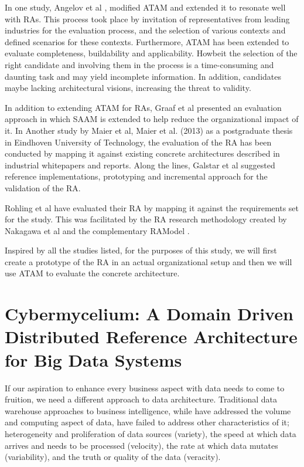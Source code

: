 \documentclass[review]{elsarticle}
\begin{document}
In one study, Angelov et al \cite{angelov2008towards}, modified ATAM and extended it to resonate well with RAs. This process took place by invitation of representatives from leading industries for the evaluation process, and the selection of various contexts and defined scenarios for these contexts. Furthermore, ATAM has been extended to evaluate completeness, buildability and applicability. Howbeit the selection of the right candidate and involving them in the process is a time-consuming and daunting task and may yield incomplete information. In addition, candidates maybe lacking architectural visions, increasing the threat to validity.

In addition to extending ATAM for RAs, Graaf et al \cite{graaf2005evaluating} presented an evaluation approach in which SAAM is extended to help reduce the organizational impact of it. In Another study by Maier et al, Maier et al. (2013) as a postgraduate thesis in Eindhoven University of Technology, the evaluation of the RA has been conducted by mapping it against existing concrete architectures described in industrial whitepapers and reports. Along the lines, Galstar et al \cite{galster2011empirically} suggested reference implementations, prototyping and incremental approach for the validation of the RA.

Rohling et al \cite{rohling2019reference} have evaluated their RA by mapping it against the requirements set for the study. This was facilitated by the RA research methodology created by Nakagawa et al \cite{Nakagawa} and the complementary RAModel \cite{nakagawa2012ramodel}.

Inspired by all the studies listed, for the purposes of this study, we will first create a prototype of the RA in an actual organizational setup and then we will use ATAM to evaluate the concrete architecture.

\section{Cybermycelium: A Domain Driven Distributed Reference Architecture for Big Data Systems}

If our aspiration to enhance every business aspect with data needs to come to fruition, we need a different approach to data architecture. Traditional data warehouse approaches to business intelligence, while have addressed the volume and computing aspect of data, have failed to address other characteristics of it; heterogeneity and proliferation of data sources (variety), the speed at which data arrives and needs to be processed (velocity), the rate at which data mutates (variability), and the truth or quality of the data (veracity).
\end{document}
